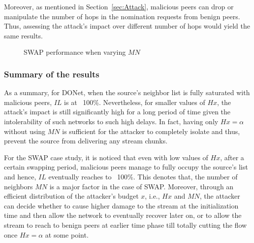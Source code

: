 Moreover, as mentioned in Section~\ref{sec:Attack}, malicious peers can drop or manipulate the number of hops in the nomination requests from benign peers.
Thus, assessing the attack's impact over different number of hops would yield the same results.

\begin{figure}[t!]
\centering

  \mbox{}
  \mbox{}
  \mbox{}
  
  \caption{SWAP performance when varying $MN$}

  \label{fig:varyingMN}
  \end{figure}
  
\subsubsection{Summary of the results}

As a summary, for DONet, when the source's neighbor list is fully saturated with malicious peers, $IL$ is at ~100\%.
Nevertheless, for smaller values of $Hx$, the attack's impact is still significantly high for a long period of time given the intolerability of such networks to such high delays.
In fact, having only $Hx=\alpha$ without using $MN$ is sufficient for the attacker to completely isolate and thus, prevent the source from delivering any stream chunks.

For the SWAP case study, it is noticed that even with low values of $Hx$, after a certain swapping period, malicious peers manage to fully occupy the source's list and hence, $IL$ eventually reaches to ~100\%.
This denotes that, the number of neighbors $MN$ is a major factor in the case of SWAP.
Moreover, through an efficient distribution of the attacker's budget $x$, i.e., $Hx$ and $MN$, the attacker can decide whether to cause higher damage to the stream at the initialization time and then allow the network to eventually recover later on, or to allow the stream to reach to benign peers at earlier time phase till totally cutting the flow once $Hx=\alpha$ at some point.